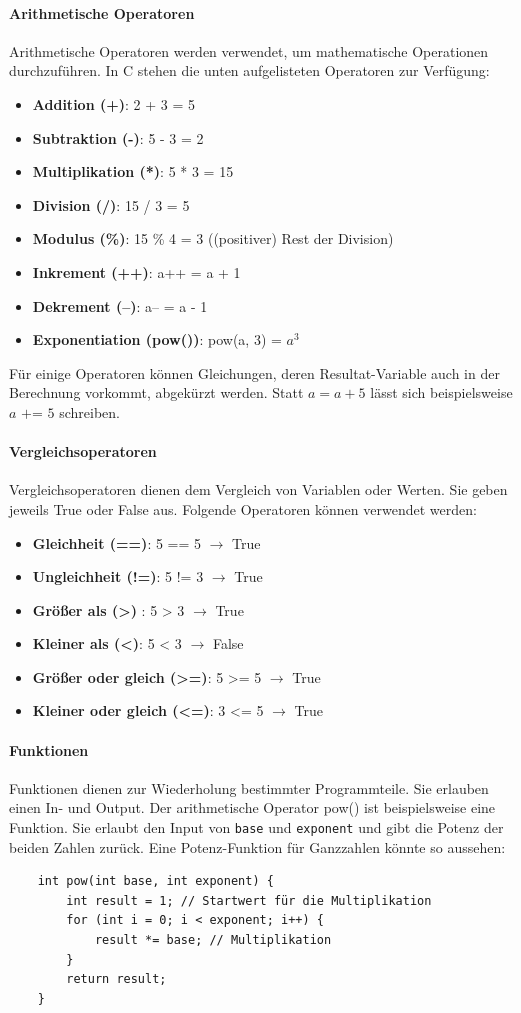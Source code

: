 \documentclass[11pt, a4paper]{article}
\begin{document}
\paragraph{Arithmetische Operatoren}
Arithmetische Operatoren werden verwendet, um mathematische Operationen durchzuführen. In C stehen die unten aufgelisteten Operatoren zur Verfügung:
\begin{itemize}
	\item \textbf{Addition (+)}: 2 + 3 = 5
	\item \textbf{Subtraktion (-)}: 5 - 3 = 2
	\item \textbf{Multiplikation (*)}: 5 * 3 = 15
	\item \textbf{Division (/)}: 15 / 3 = 5
	\item \textbf{Modulus (\%)}: 15 \% 4 = 3 ((positiver) Rest der Division)
	\item \textbf{Inkrement (++)}: a++ = a + 1
	\item \textbf{Dekrement (--)}: a-- = a - 1
	\item \textbf{Exponentiation (pow())}: pow(a, 3) = $a^3$
\end{itemize}
Für einige Operatoren können Gleichungen, deren Resultat-Variable auch in der Berechnung vorkommt, abgekürzt werden. Statt \(a = a + 5\) lässt sich beispielsweise \(a \text{ += } 5\) schreiben.

\paragraph{Vergleichsoperatoren}
Vergleichsoperatoren dienen dem Vergleich von Variablen oder Werten. Sie geben jeweils True oder False aus. Folgende Operatoren können verwendet werden:
\begin{itemize}
	\item \textbf{Gleichheit (==)}: 5 == 5 $\rightarrow$ True
	\item \textbf{Ungleichheit (!=)}: 5 != 3 $\rightarrow$ True
	\item \textbf{Größer als (>) }: 5 > 3 $\rightarrow$ True
	\item \textbf{Kleiner als (<)}: 5 < 3 $\rightarrow$ False
	\item \textbf{Größer oder gleich (>=)}: 5 >= 5 $\rightarrow$ True
	\item \textbf{Kleiner oder gleich (<=)}: 3 <= 5 $\rightarrow$ True
\end{itemize}

\paragraph{Funktionen}
Funktionen dienen zur Wiederholung bestimmter Programmteile. Sie erlauben einen In- und Output. Der arithmetische Operator pow() ist beispielsweise eine Funktion. Sie erlaubt den Input von \texttt{base} und \texttt{exponent} und gibt die Potenz der beiden Zahlen zurück. Eine Potenz-Funktion für Ganzzahlen könnte so aussehen:
\begin{lstlisting}
	int pow(int base, int exponent) {
		int result = 1; // Startwert für die Multiplikation
		for (int i = 0; i < exponent; i++) {
			result *= base; // Multiplikation
		}
		return result;
	}
\end{lstlisting}
\end{document}
